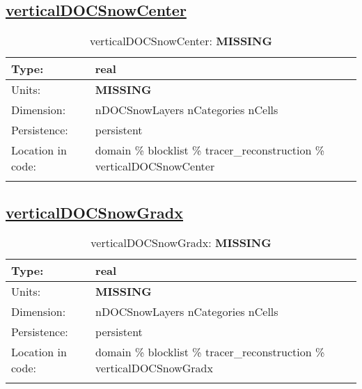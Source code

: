 \subsection[verticalDOCSnowCenter]{\hyperref[sec:var_tab_tracer_reconstruction]{verticalDOCSnowCenter}}
\label{subsec:var_sec_tracer_reconstruction_verticalDOCSnowCenter}
\begin{center}
\begin{longtable}{| p{2.0in} | p{4.0in} |}
        \hline 
        Type: & real \\
        \hline 
        Units: & {\bf \color{red} MISSING} \\
        \hline 
        Dimension: & nDOCSnowLayers nCategories nCells \\
        \hline 
        Persistence: & persistent \\
        \hline 
         Location in code: & domain \% blocklist \% tracer\_reconstruction \% verticalDOCSnowCenter \\
         \hline 
    \caption{verticalDOCSnowCenter: {\bf \color{red} MISSING}}
\end{longtable}
\end{center}
\subsection[verticalDOCSnowGradx]{\hyperref[sec:var_tab_tracer_reconstruction]{verticalDOCSnowGradx}}
\label{subsec:var_sec_tracer_reconstruction_verticalDOCSnowGradx}
\begin{center}
\begin{longtable}{| p{2.0in} | p{4.0in} |}
        \hline 
        Type: & real \\
        \hline 
        Units: & {\bf \color{red} MISSING} \\
        \hline 
        Dimension: & nDOCSnowLayers nCategories nCells \\
        \hline 
        Persistence: & persistent \\
        \hline 
         Location in code: & domain \% blocklist \% tracer\_reconstruction \% verticalDOCSnowGradx \\
         \hline 
    \caption{verticalDOCSnowGradx: {\bf \color{red} MISSING}}
\end{longtable}
\end{center}
